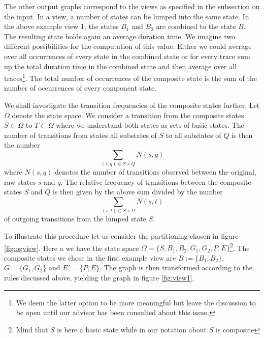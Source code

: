 \documentclass[12pt]{extarticle}
\begin{document}
The other output graphs correspond to the views as specified in the subsection on the input. In a view, a number of states can be lumped into the same state. In the above example view 1, the states $B_1$ and $B_2$ are combined to the state $B$. The resulting state holds again an average duration time. We imagine two different possibilities for the computation of this value. Either we could average over all occurrences of every state in the combined state or for every trace sum up the total duration time in the combined state and then average over all traces\footnote{We deem the latter option to be more meaningful but leave the discussion to be open until our advisor has been consulted about this issue.}. The total number of occurrences of the composite state is the sum of the number of occurrences of every component state. 



We shall investigate the transition frequencies of the composite states further. Let $\Omega$ denote the state space. We consider a transition from the composite states $S \subset \Omega$ to $T \subset \Omega$ where we understand both states as sets of basic states. The number of transitions from states all substates of $S$ to all substates of $Q$ is then the number
\[ 
    \sum_{(s,q) \in S \times Q} N(s,q)
\]
where $N(s,q)$ denotes the number of transitions observed between the original, raw states $s$ and $q$. The relative frequency of transitions between the composite states $S$ and $Q$ is then given by the above sum divided by the number
\[
    \sum_{(s,t) \in S \times \Omega} N(s,t)
\]
of outgoing transitions from the lumped state $S$.

To illustrate this procedure let us consider the partitioning chosen in figure \ref{fig:ogview}. Here a we have the state space $\Omega = \{ S, B_1, B_2, G_1, G_2, P, E \}$\footnote{Mind that $S$ is here a basic state while in our notation about $S$ is composite}. The composite states we chose in the first example view are $B := \{ B_1, B_2 \} $, $G = \{ G_1, G_2 \}$ and $E' = \{ P, E \}$. The graph is then transformed according to the rules discussed above, yielding the graph in figure \ref{fig:view1}.
\end{document}
